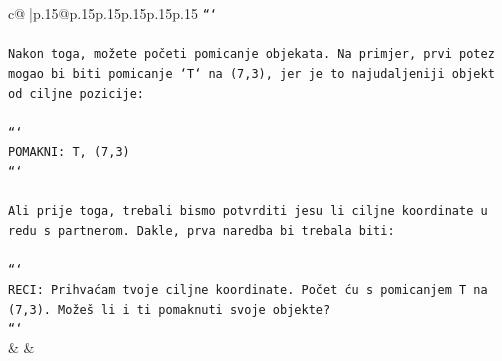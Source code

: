 \documentclass{article}
\begin{document}
{\begin{supertabular}{c@{$\;$}|p{.15\linewidth}@{}p{.15\linewidth}p{.15\linewidth}p{.15\linewidth}p{.15\linewidth}p{.15\linewidth}}
{{{\texttt{```} \\
\\ 
\texttt{Nakon toga, možete početi pomicanje objekata. Na primjer, prvi potez mogao bi biti pomicanje `T` na (7,3), jer je to najudaljeniji objekt od ciljne pozicije:} \\
\\ 
\texttt{```} \\
\texttt{POMAKNI: T, (7,3)} \\
\texttt{```} \\
\\ 
\texttt{Ali prije toga, trebali bismo potvrditi jesu li ciljne koordinate u redu s partnerom. Dakle, prva naredba bi trebala biti:} \\
\\ 
\texttt{```} \\
\texttt{RECI: Prihvaćam tvoje ciljne koordinate. Počet ću s pomicanjem T na (7,3). Možeš li i ti pomaknuti svoje objekte?} \\
\texttt{```} \\
            }
        }
    }
    & & \\ \\


\end{supertabular}}
\end{document}
